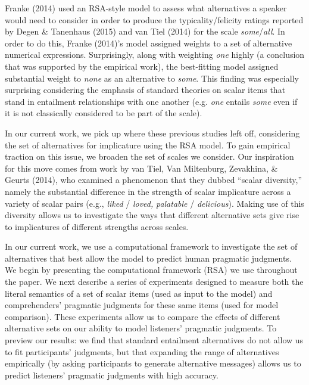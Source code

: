 \documentclass[10pt, letterpaper]{article}
\begin{document}
Franke (2014) used an RSA-style model to assess what alternatives a
speaker would need to consider in order to produce the
typicality/felicity ratings reported by Degen \& Tanenhaus (2015) and
{van Tiel} (2014) for the scale \emph{some}/\emph{all}. In order to do
this, Franke (2014)'s model assigned weights to a set of alternative
numerical expressions. Surprisingly, along with weighting \emph{one}
highly (a conclusion that was supported by the empirical work), the
best-fitting model assigned substantial weight to \emph{none} as an
alternative to \emph{some}. This finding was especially surprising
considering the emphasis of standard theories on scalar items that stand
in entailment relationships with one another (e.g. \emph{one} entails
\emph{some} even if it is not classically considered to be part of the
scale).

In our current work, we pick up where these previous studies left off,
considering the set of alternatives for implicature using the RSA model.
To gain empirical traction on this issue, we broaden the set of scales
we consider. Our inspiration for this move comes from work by {van
Tiel}, Van Miltenburg, Zevakhina, \& Geurts (2014), who examined a
phenomenon that they dubbed ``scalar diversity,'' namely the substantial
difference in the strength of scalar implicature across a variety of
scalar pairs (e.g., \emph{liked} / \emph{loved,} \emph{palatable} /
\emph{delicious}). Making use of this diversity allows us to investigate
the ways that different alternative sets give rise to implicatures of
different strengths across scales.

In our current work, we use a computational framework to investigate the
set of alternatives that best allow the model to predict human pragmatic
judgments. We begin by presenting the computational framework (RSA) we
use throughout the paper. We next describe a series of experiments
designed to measure both the literal semantics of a set of scalar items
(used as input to the model) and comprehenders' pragmatic judgments for
these same items (used for model comparison). These experiments allow us
to compare the effects of different alternative sets on our ability to
model listeners' pragmatic judgments. To preview our results: we find
that standard entailment alternatives do not allow us to fit
participants' judgments, but that expanding the range of alternatives
empirically (by asking participants to generate alternative messages)
allows us to predict listeners' pragmatic judgments with high accuracy.
\end{document}
